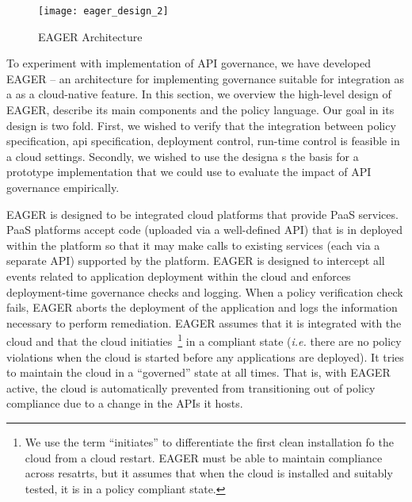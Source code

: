 \begin{figure*}[t]
\centering
\texttt{[image: eager\_design\_2]}
\caption{EAGER Architecture
\label{fig:eager_design}
}
\end{figure*}

To experiment with implementation of API governance, we have developed EAGER
-- an architecture for implementing governance suitable for integration as a
as a cloud-native feature.
In this section, we
overview the high-level design of EAGER, describe its main
components and the policy language.  Our goal in its design is two fold.
First, we wished to verify that the integration between policy specification,
api specification,
deployment control, run-time control is feasible in a cloud settings.
Secondly, we wished to use the designa s the basis for a prototype
implementation that we could use to evaluate the impact of API governance
empirically.

EAGER is designed to be integrated cloud platforms that provide PaaS services. 
PaaS platforms accept code (uploaded via a well-defined API) that is in
deployed within the platform so that it may make calls to existing services
(each via a separate API) supported by the platform.
EAGER is designed to intercept all events related to application 
deployment within the cloud
and enforces deployment-time governance checks and
logging. 
When a policy verification check fails, 
EAGER aborts the deployment of the application and logs the information
necessary to perform remediation.  EAGER assumes that it is integrated with
the cloud and that the cloud initiaties~\footnote{We use the term
``initiates'' to differentiate the first clean installation fo the cloud from
a cloud restart.  EAGER must be able to maintain compliance across resatrts,
but it assumes that when the cloud is installed and suitably tested, it is in
a policy compliant state.} 
in a compliant state ({\em i.e.} there are
no policy violations when the cloud is started before any applications are
deployed).  It tries to maintain the cloud
in a ``governed'' state at all times.  That is, with EAGER active, the cloud
is
automatically prevented from transitioning out of policy compliance due to a
change in the APIs it hosts.

